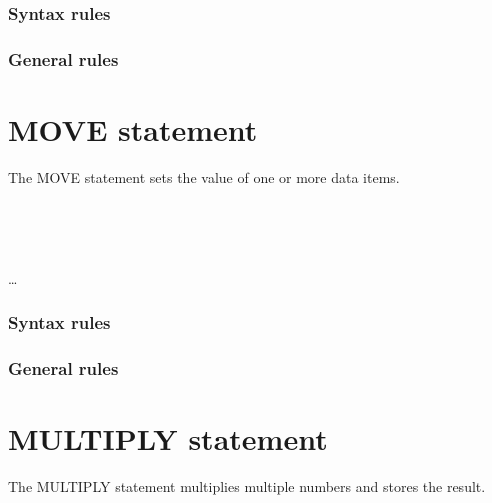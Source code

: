 \subsubsection{Syntax rules}

\subsubsection{General rules}

\section{MOVE statement}

The MOVE statement sets the value of one or more data items.

\begin{syntax}
  \begin{0-1}
     \\
  \end{0-1}
  \begin{1=}
    \identifier \\
    \literal
  \end{1=}
  \begin{1=}
    \identifier
  \end{1=} \ldots
\end{syntax}

\subsubsection{Syntax rules}

\subsubsection{General rules}

\section{MULTIPLY statement}

The MULTIPLY statement multiplies multiple numbers and stores the result.

